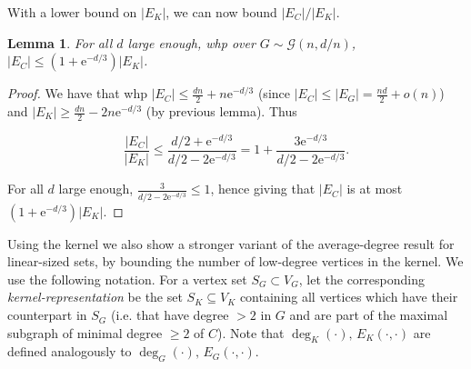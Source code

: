 \documentclass[11pt]{article}
\theoremstyle{plain}
\newtheorem{lemma}[theorem]{Lemma}
\newcommand{\G}{\mathcal{G}}
\newcommand{\emm}{\mathrm{e}}
\newcommand{\1}{\mathbb{1}}
\begin{document}
With a lower bound on \(|E_K|\), we can now bound \(|E_C|/|E_K|\).

\begin{lemma}\label{lem:not-too-many-expanded-edges-overal}
    For all \(d\) large enough, whp over \(G\sim\G(n,d/n)\), \(|E_C| \leq (1+\emm^{-d/3})|E_K|\). 
\end{lemma}
\begin{proof}
    We have that whp \(|E_C|\leq \tfrac{dn}{2}+n\emm^{-d/3}\) (since \(|E_C|\leq |E_G| = \tfrac{nd}{2}+o(n)\)) and \(|E_K|\geq \tfrac{dn}{2}-2n\emm^{-d/3}\) (by previous lemma). Thus
    
    \[\frac{|E_C|}{|E_K|}\leq \frac{d/2 + \emm^{-d/3}}{d/2 - 2\emm^{-d/3}} = 1 + \frac{3\emm^{-d/3}}{d/2 - 2\emm^{-d/3}}.\]
    
    For all \(d\) large enough, \(\frac{3}{d/2 - 2\emm^{-d/3}}\leq 1\), hence giving that \(|E_C|\) is at most \((1+\emm^{-d/3})|E_K|\).
    






\end{proof}

Using the kernel we also show a stronger variant of the average-degree result for linear-sized sets, by bounding the number of low-degree vertices in the kernel.
We use the following notation. For a vertex set \(S_G\subset V_G\), let the corresponding \textit{kernel-representation} be the set \(S_K\subseteq V_K\) containing all vertices which have their counterpart in \(S_G\) (i.e. that have degree \(>2\) in \(G\) and are part of the maximal subgraph of minimal degree \(\geq 2\) of \(C\)). Note that \(\deg_K(\cdot),\, E_K(\cdot,\cdot)\) are defined analogously to \(\deg_G(\cdot),\, E_G(\cdot,\cdot)\).
\end{document}
